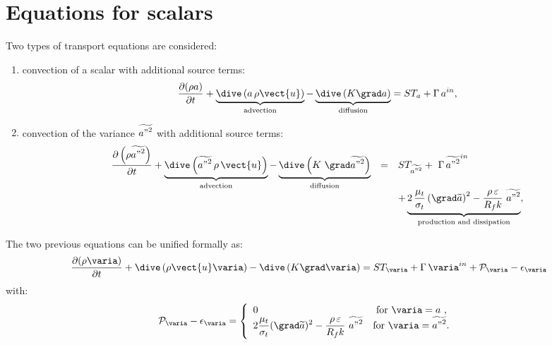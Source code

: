 \section{Equations for scalars}

Two types of transport equations are considered:
%
\begin{enumerate}[ label=\roman{*}/, ref=(\roman{*})]
\item convection of a scalar with additional source terms:
\begin{equation}
\frac{\partial (\rho a)}{\partial t} +
\underbrace{
\dive \left( a \, \rho \vect{u}
\right)
}_{\text{advection}}
-\underbrace{
\dive \left( K\grad a \right)
}_{
\text{diffusion}} = ST_{a}+\Gamma \,a^{in},
\end{equation}

\item convection of the variance $\widetilde{{a"}^{2}}$ with
additional source terms:
\begin{equation}
\begin{array}{rcl}
\displaystyle\frac{\partial \left(\rho \widetilde{{a"}^{2}}\right)}{\partial t}+
\underbrace{
\dive \left( \widetilde{{a"}^{2}} \, \rho \,\vect{u} \right)
}_{\text{advection}}
-\underbrace{
\dive \left( K\ \grad\widetilde{{a"}^{2}} \right)
}_{\text{diffusion}}
&=&ST_{\widetilde{{a"}^{2}}}+ \ \Gamma \, \widetilde{{a"}^{2}}^{in}
\\
& &\displaystyle +
\underbrace{
2\,\frac{\mu _{t}}{\sigma _{t}} \left( \grad\widetilde{a} \right)^{2}-
\frac{\rho \,\varepsilon }{R_{f}k}\ \widetilde{{a"}^{2}}
}_{\text{production and dissipation}} ,
\end{array}%
\end{equation}%
\end{enumerate}

The two previous equations can be unified formally as:
\begin{equation}\label{eq:goveqn:base_introd_depart}
\frac{\partial (\rho \varia)}{\partial t}+\dive \left( \rho \vect{u} \varia \right)
-\dive \left( K\grad \varia \right) = ST_{\varia}+\Gamma \,\varia^{in}+ \mathcal{P}_\varia - \mathcal{\epsilon}_\varia
\end{equation}%
with:
\begin{equation}
 \mathcal{P}_\varia - \mathcal{\epsilon}_\varia  =
\left\{
\begin{array}{ll}
 0 & \text{ for $\varia=a$ }, \\
 2 \displaystyle \frac{\mu_t}{\sigma_t}(\grad \widetilde{a})^2 - \displaystyle
\frac{\rho\,\varepsilon}{R_f k}\ \widetilde{{a"}^2} & \text{for
$\varia=\widetilde{{a"}^2}$. }
\end{array}%
\right.
\end{equation}

